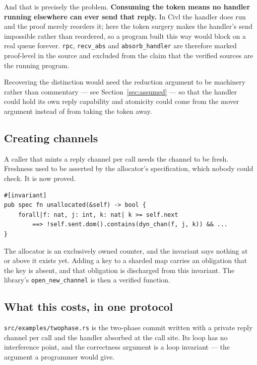\documentclass[11pt]{article}
\newcommand{\code}[1]{\texttt{#1}}
\newcommand{\srcname}[1]{%
  \vspace{0.9em}\noindent{\sffamily\scriptsize\color{comment}\MakeUppercase{#1}}\par
  \vspace{-0.7em}}
\begin{document}
And that is precisely the problem. \textbf{Consuming the token means no handler
running elsewhere can ever send that reply.} In Civl the handler does run and
the proof merely reorders it; here the token surgery makes the handler's send
impossible rather than reordered, so a program built this way would block on a
real queue forever. \code{rpc}, \code{recv\_abs} and \code{absorb\_handler} are
therefore marked proof-level in the source and excluded from the claim that the
verified sources are the running program.

Recovering the distinction would need the reduction argument to be machinery
rather than commentary --- see Section~\ref{sec:assumed} --- so that the
handler could hold its own reply capability and atomicity could come from the
mover argument instead of from taking the token away.

\subsection*{Creating channels}

A caller that mints a reply channel per call needs the channel to be fresh.
Freshness used to be asserted by the allocator's specification, which nobody
could check. It is now proved.

\srcname{src/tok.rs --- the allocator's invariant}
\begin{lstlisting}
#[invariant]
pub spec fn unallocated(&self) -> bool {
    forall|f: nat, j: int, k: nat| k >= self.next
        ==> !self.sent.dom().contains(dyn_chan(f, j, k)) && ...
}
\end{lstlisting}

The allocator is an exclusively owned counter, and the invariant says nothing at
or above it exists yet. Adding a key to a sharded map carries an obligation that
the key is absent, and that obligation is discharged from this invariant. The
library's \code{open\_new\_channel} is then a verified function.

\subsection*{What this costs, in one protocol}

\code{src/examples/twophase.rs} is the two-phase commit written with a private
reply channel per call and the handler absorbed at the call site. Its loop has
no interference point, and the correctness argument is a loop invariant --- the
argument a programmer would give.
\end{document}
